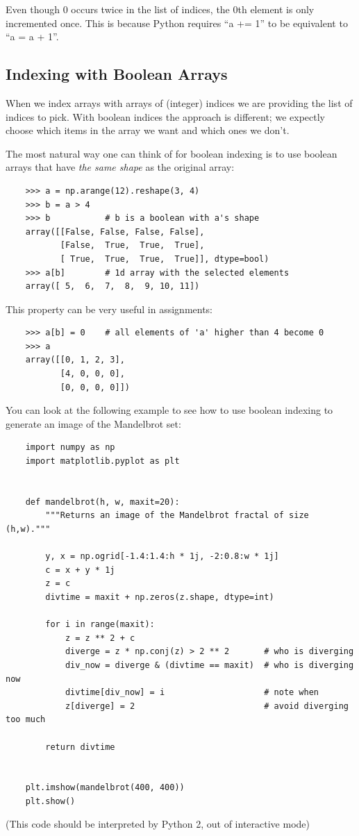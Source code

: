 \documentclass[UTF8]{article}
\begin{document}
Even though 0 occurs twice in the list of indices, the 0th element is only incremented once. This
is because Python requires ``a += 1'' to be equivalent to ``a = a + 1''.

\subsection{Indexing with Boolean Arrays}
When we index arrays with arrays of (integer) indices we are providing the list of indices to pick.
With boolean indices the approach is different; we expectly choose which items in the array we want
and which ones we don't.

The most natural way one can think of for boolean indexing is to use boolean arrays that have
\emph{the same shape} as the original array:
\begin{verbatim}
    >>> a = np.arange(12).reshape(3, 4)
    >>> b = a > 4
    >>> b           # b is a boolean with a's shape
    array([[False, False, False, False],
           [False,  True,  True,  True],
           [ True,  True,  True,  True]], dtype=bool)
    >>> a[b]        # 1d array with the selected elements
    array([ 5,  6,  7,  8,  9, 10, 11])
\end{verbatim}

This property can be very useful in assignments:
\begin{verbatim}
    >>> a[b] = 0    # all elements of 'a' higher than 4 become 0
    >>> a
    array([[0, 1, 2, 3],
           [4, 0, 0, 0],
           [0, 0, 0, 0]])
\end{verbatim}

You can look at the following example to see how to use boolean indexing to generate an image of
the Mandelbrot set:
\begin{verbatim}
    import numpy as np
    import matplotlib.pyplot as plt


    def mandelbrot(h, w, maxit=20):
        """Returns an image of the Mandelbrot fractal of size (h,w)."""

        y, x = np.ogrid[-1.4:1.4:h * 1j, -2:0.8:w * 1j]
        c = x + y * 1j
        z = c
        divtime = maxit + np.zeros(z.shape, dtype=int)

        for i in range(maxit):
            z = z ** 2 + c
            diverge = z * np.conj(z) > 2 ** 2       # who is diverging
            div_now = diverge & (divtime == maxit)  # who is diverging now
            divtime[div_now] = i                    # note when
            z[diverge] = 2                          # avoid diverging too much

        return divtime


    plt.imshow(mandelbrot(400, 400))
    plt.show()
\end{verbatim}
(This code should be interpreted by Python 2, out of interactive mode)
\end{document}
